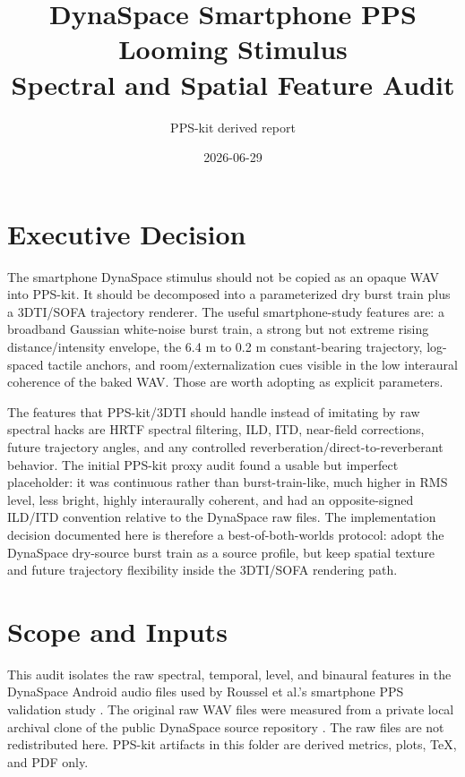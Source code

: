 \documentclass[10pt]{article}
\title{DynaSpace Smartphone PPS Looming Stimulus\\Spectral and Spatial Feature Audit}
\author{PPS-kit derived report}
\date{2026-06-29}
\begin{document}
\maketitle

\section*{Executive Decision}

The smartphone DynaSpace stimulus should not be copied as an opaque WAV into PPS-kit. It should be decomposed into a parameterized dry burst train plus a 3DTI/SOFA trajectory renderer. The useful smartphone-study features are: a broadband Gaussian white-noise burst train, a strong but not extreme rising distance/intensity envelope, the 6.4 m to 0.2 m constant-bearing trajectory, log-spaced tactile anchors, and room/externalization cues visible in the low interaural coherence of the baked WAV. Those are worth adopting as explicit parameters.

The features that PPS-kit/3DTI should handle instead of imitating by raw spectral hacks are HRTF spectral filtering, ILD, ITD, near-field corrections, future trajectory angles, and any controlled reverberation/direct-to-reverberant behavior. The initial PPS-kit proxy audit found a usable but imperfect placeholder: it was continuous rather than burst-train-like, much higher in RMS level, less bright, highly interaurally coherent, and had an opposite-signed ILD/ITD convention relative to the DynaSpace raw files. The implementation decision documented here is therefore a best-of-both-worlds protocol: adopt the DynaSpace dry-source burst train as a source profile, but keep spatial texture and future trajectory flexibility inside the 3DTI/SOFA rendering path.

\section*{Scope and Inputs}

This audit isolates the raw spectral, temporal, level, and binaural features in the DynaSpace Android audio files used by Roussel et al.'s smartphone PPS validation study \cite{roussel2025}. The original raw WAV files were measured from a private local archival clone of the public DynaSpace source repository \cite{dynaspace_repo}. The raw files are not redistributed here. PPS-kit artifacts in this folder are derived metrics, plots, TeX, and PDF only.
\end{document}
